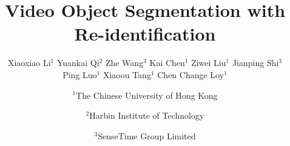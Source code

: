 \documentclass[10pt,twocolumn,letterpaper]{article}
\begin{document}
	
	\title{Video Object Segmentation with Re-identification}
	
	\author{Xiaoxiao Li$^{1}$ \quad Yuankai Qi$^{2}$ \quad Zhe Wang$^{3}$ \quad Kai Chen$^{1}$ \quad Ziwei Liu$^{1}$ \quad Jianping Shi$^{3}$ \quad \\
		\quad Ping Luo$^{1}$ \quad Xiaoou Tang$^{1}$ \quad Chen Change Loy$^{1}$ \\
		\and
		$^1$The Chinese University of Hong Kong \\
		\and
		$^2$Harbin Institute of Technology \\
		\and
		$^3$SenseTime Group Limited \\
	}
	
	\maketitle
	
	


	


	


	


	


	

	
	{\small
		
		
	}
	
\end{document}
